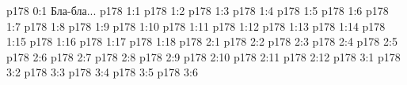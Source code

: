\author{Промежуточные создания}
\vs p178 0:1  Бла-бла...
\vs p178 1:1 
\vs p178 1:2 \pc 
\vs p178 1:3 
\vs p178 1:4 
\vs p178 1:5 
\vs p178 1:6 
\vs p178 1:7 
\vs p178 1:8 
\vs p178 1:9 
\vs p178 1:10 
\vs p178 1:11 
\vs p178 1:12 
\vs p178 1:13 
\vs p178 1:14 
\vs p178 1:15 
\vs p178 1:16 
\vs p178 1:17 
\vs p178 1:18 \pc 
{}
\vs p178 2:1 
\vs p178 2:2 
\vs p178 2:3 
\vs p178 2:4 
\vs p178 2:5 
\vs p178 2:6 
\vs p178 2:7 
\vs p178 2:8 
\vs p178 2:9 
\vs p178 2:10 \pc 
\vs p178 2:11 
\vs p178 2:12 \pc 
{}
\vs p178 3:1 
\vs p178 3:2 \pc 
\vs p178 3:3 
\vs p178 3:4 
\vs p178 3:5 \pc 
\vs p178 3:6 
\quizlink
